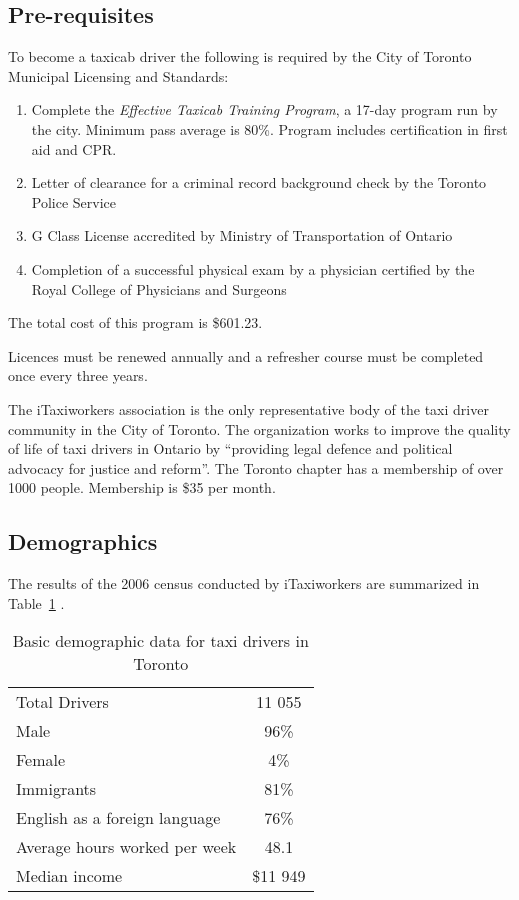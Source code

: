\documentclass[11pt]{article}
\begin{document}
\subsection{Pre-requisites}
To become a taxicab driver the following is required by the City of Toronto Municipal Licensing and Standards:
\begin{enumerate}
\item Complete the \emph{Effective Taxicab Training Program}, a 17-day program run by the city. 
Minimum pass average is 80\%. Program includes certification in first aid and CPR.
\item Letter of clearance for a criminal record background check by the Toronto Police Service
\item G Class License accredited by Ministry of Transportation of Ontario 
\item Completion of a successful physical exam by a physician certified by the Royal College of Physicians and Surgeons 
\end{enumerate}
The total cost of this program is \$601.23\cite{MLS2013}.

Licences must be renewed annually %
and a refresher course must be completed once every three years\cite{MLSChp545}.

The iTaxiworkers association is the only representative body of the taxi driver community in the City of Toronto. 
The organization works to improve the quality of life of taxi drivers in Ontario by ``providing legal defence
and political advocacy for justice and reform''\cite{iTaxiWorkers2012}. The Toronto chapter
has a membership of over 1000 people. Membership is \$35 per month\cite{iTaxi2012, Abdiemail}.

\subsection{Demographics}
The results of the 2006 census conducted by iTaxiworkers are summarized in Table~\ref{tab:demographics} \cite{iTaxiWorkers2012}.
\begin{table}[h!]
\centering
\caption{Basic demographic data for taxi drivers in Toronto}
\label{tab:demographics}
\begin{tabular}{l c}
 Total Drivers & 11 055 \\
 Male & 96\% \\
 Female & 4\% \\
 Immigrants & 81\% \\
 English as a foreign language & 76\% \\
 Average hours worked per week & 48.1 \\
 Median income & \$11 949 \\
\end{tabular}
\end{table}
\end{document}
